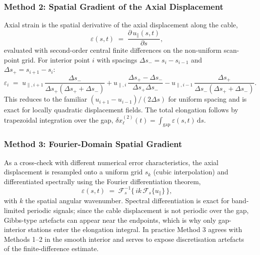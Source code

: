 \subsubsection{Method 2: Spatial Gradient of the Axial Displacement}
Axial strain is the spatial derivative of the axial displacement along the
cable,
\begin{equation}
  \varepsilon(s,t) \;=\; \frac{\partial\, u_\parallel(s,t)}{\partial s},
  \label{eq:strainM2def}
\end{equation}
evaluated with second-order central finite differences on the non-uniform
scan-point grid. For interior point $i$ with spacings
$\Delta s_- = s_i - s_{i-1}$ and $\Delta s_+ = s_{i+1} - s_i$:
\begin{equation}
  \varepsilon_i \;=\;
    u_{\parallel,i+1}\,\frac{\Delta s_-}{\Delta s_+(\Delta s_+ + \Delta s_-)}
  + u_{\parallel,i}\,\frac{\Delta s_+ - \Delta s_-}{\Delta s_+ \Delta s_-}
  - u_{\parallel,i-1}\,\frac{\Delta s_+}{\Delta s_-(\Delta s_+ + \Delta s_-)} .
  \label{eq:strainM2}
\end{equation}
This reduces to the familiar $(u_{i+1}-u_{i-1})/(2\Delta s)$ for uniform
spacing and is exact for locally quadratic displacement fields. The total
elongation follows by trapezoidal integration over the gap,
$\delta x_\ell^{(2)}(t) = \int_\mathrm{gap} \varepsilon(s,t)\,\mathrm{d}s$.

\subsubsection{Method 3: Fourier-Domain Spatial Gradient}
As a cross-check with different numerical error characteristics, the axial
displacement is resampled onto a uniform grid $s_k$ (cubic interpolation)
and differentiated spectrally using the Fourier differentiation theorem,
\begin{equation}
  \varepsilon(s,t) \;=\;
  \mathcal{F}_s^{-1}\bigl\{\, i k\, \mathcal{F}_s\{u_\parallel\}\,\bigr\},
  \label{eq:strainM3}
\end{equation}
with $k$ the spatial angular wavenumber. Spectral differentiation is exact
for band-limited periodic signals; since the cable displacement is not
periodic over the gap, Gibbs-type artefacts can appear near the endpoints,
which is why only gap-interior stations enter the elongation integral. In
practice Method 3 agrees with Methods 1--2 in the smooth interior and serves
to expose discretisation artefacts of the finite-difference estimate.

